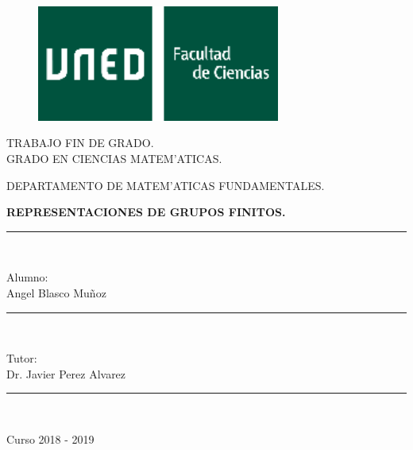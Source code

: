 \documentclass[a4paper,openright,12pt]{book}
\numberwithin{equation}{section} %
\begin{document}
\begin{titlepage}

\begin{center}
\vspace*{0.6in}
\begin{figure}[htb]
\begin{center}
\includegraphics[width=8cm]{./logo_uned.png}
\end{center}
\end{figure}

\begin{large}
TRABAJO FIN DE GRADO.\\
GRADO EN CIENCIAS MATEM'ATICAS.\\
\end{large}
\vspace*{0.15in}
DEPARTAMENTO DE MATEM'ATICAS FUNDAMENTALES. \\
\vspace*{0.4in}

\begin{Large}
\textbf{REPRESENTACIONES DE GRUPOS FINITOS.} \\
\end{Large}
\vspace*{0.3in}

\rule{80mm}{0.1mm}\\
\vspace*{0.1in}
\begin{large}
Alumno: \\
Angel Blasco Mu\~noz \\
\end{large}

\rule{80mm}{0.1mm}\\
\vspace*{0.1in}
\begin{large}
Tutor:\\
Dr. Javier Perez Alvarez\\
\end{large}
\rule{80mm}{0.1mm}\\

\end{center}
\vspace*{1in}
\begin{flushright}
Curso 2018 - 2019
\end{flushright}
\end{titlepage}
\newpage
$\ $
\thispagestyle{empty}
%
\end{document}
